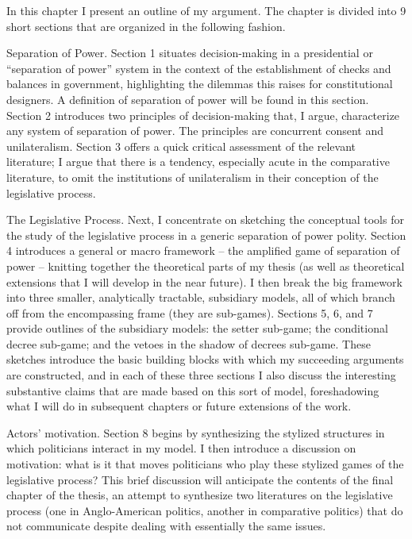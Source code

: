 In this chapter I present an outline of my argument.  The chapter is divided into 9 short sections that are organized in the following fashion.  

Separation of Power.  Section 1 situates decision-making in a presidential or “separation of power” system in the context of the establishment of checks and balances in government, highlighting the dilemmas this raises for constitutional designers.  A definition of separation of power will be found in this section.  Section 2 introduces two principles of decision-making that, I argue, characterize any system of separation of power.  The principles are concurrent consent and unilateralism.  Section 3 offers a quick critical assessment of the relevant literature; I argue that there is a tendency, especially acute in the comparative literature, to omit the institutions of unilateralism in their conception of the legislative process.  

The Legislative Process.  Next, I concentrate on sketching the conceptual tools for the study of the legislative process in a generic separation of power polity.  Section 4 introduces a general or macro framework – the amplified game of separation of power – knitting together the theoretical parts of my thesis (as well as theoretical extensions that I will develop in the near future).  I then break the big framework into three smaller, analytically tractable, subsidiary models, all of which branch off from the encompassing frame (they are sub-games).  Sections 5, 6, and 7 provide outlines of the subsidiary models: the setter sub-game; the conditional decree sub-game; and the vetoes in the shadow of decrees sub-game.  These sketches introduce the basic building blocks with which my succeeding arguments are constructed, and in each of these three sections I also discuss the interesting substantive claims that are made based on this sort of model, foreshadowing what I will do in subsequent chapters or future extensions of the work.  

Actors' motivation.  Section 8 begins by synthesizing the stylized structures in which politicians interact in my model.  I then introduce a discussion on motivation: what is it that moves politicians who play these stylized games of the legislative process?  This brief discussion will anticipate the contents of the final chapter of the thesis, an attempt to synthesize two literatures on the legislative process (one in Anglo-American politics, another in comparative politics) that do not communicate despite dealing with essentially the same issues.  

